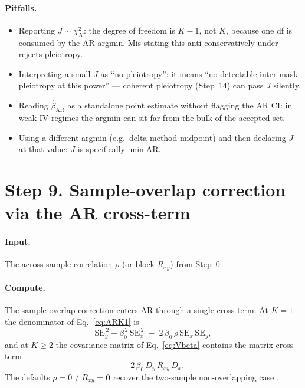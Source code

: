 \documentclass[11pt]{article}
\begin{document}
\paragraph{Pitfalls.}
\begin{itemize}
\item Reporting $J\sim\chi^2_K$: the degree of freedom is $K-1$, not $K$, because one df is consumed by the AR argmin. Mis-stating this anti-conservatively under-rejects pleiotropy.
\item Interpreting a small $J$ as ``no pleiotropy'': it means ``no detectable inter-mask pleiotropy at this power'' --- coherent pleiotropy (Step~14) can pass $J$ silently.
\item Reading $\hat\beta_{\mathrm{AR}}$ as a standalone point estimate without flagging the AR CI: in weak-IV regimes the argmin can sit far from the bulk of the accepted set.
\item Using a different argmin (e.g.\ delta-method midpoint) and then declaring $J$ at that value: $J$ is specifically $\min\mathrm{AR}$.
\end{itemize}

\section*{Step 9. Sample-overlap correction via the AR cross-term}

\paragraph{Input.} The across-sample correlation $\rho$ (or block $R_{xy}$) from Step~0.

\paragraph{Compute.} The sample-overlap correction enters AR through a single cross-term. At $K=1$ the denominator of Eq.~\eqref{eq:ARK1} is
\begin{equation}
\mathrm{SE}_y^{\,2} + \beta_0^{\,2}\,\mathrm{SE}_x^{\,2} \;-\; 2\,\beta_0\,\rho\,\mathrm{SE}_x\,\mathrm{SE}_y,
\label{eq:overlap-K1}
\end{equation}
and at $K\ge 2$ the covariance matrix of Eq.~\eqref{eq:Vbeta} contains the matrix cross-term
\begin{equation}
-\,2\,\beta_0\, D_y\, R_{xy}\, D_x.
\label{eq:overlap-K2}
\end{equation}
The defaults $\rho=0$ / $R_{xy}=\mathbf{0}$ recover the two-sample non-overlapping case \citep{BurgessOverlap2016}.
\end{document}
